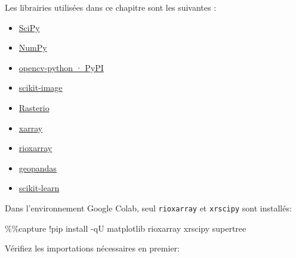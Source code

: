 \documentclass[
  french,
  11pt,
  letterpaper,
  open=any,
  twoside=false,
  french]{scrbook}
\newenvironment{Shaded}{\begin{snugshade}}{\end{snugshade}}
\newcommand{\NormalTok}[1]{\textcolor[rgb]{0.00,0.23,0.31}{#1}}
\newcommand{\OperatorTok}[1]{\textcolor[rgb]{0.37,0.37,0.37}{#1}}
\begin{document}
Les librairies utilisées dans ce chapitre sont les suivantes :

\begin{itemize}
\item
  \href{https://scipy.org/}{SciPy}
\item
  \href{https://numpy.org/}{NumPy}
\item
  \href{https://pypi.org/project/opencv-python/}{opencv-python · PyPI}
\item
  \href{https://scikit-image.org/}{scikit-image}
\item
  \href{https://rasterio.readthedocs.io/en/stable/}{Rasterio}
\item
  \href{https://docs.xarray.dev/en/stable/}{xarray}
\item
  \href{https://corteva.github.io/rioxarray/stable/index.html}{rioxarray}
\item
  \href{https://geopandas.org}{geopandas}
\item
  \href{https://scikit-learn.org/}{scikit-learn}
\end{itemize}

Dans l'environnement Google Colab, seul \texttt{rioxarray} et
\texttt{xrscipy} sont installés:

\begin{Shaded}
\begin{Highlighting}[]
\OperatorTok{\%\%}\NormalTok{capture}
\OperatorTok{!}\NormalTok{pip install }\OperatorTok{{-}}\NormalTok{qU matplotlib rioxarray xrscipy supertree}
\end{Highlighting}
\end{Shaded}

Vérifiez les importations nécessaires en premier:
\end{document}
